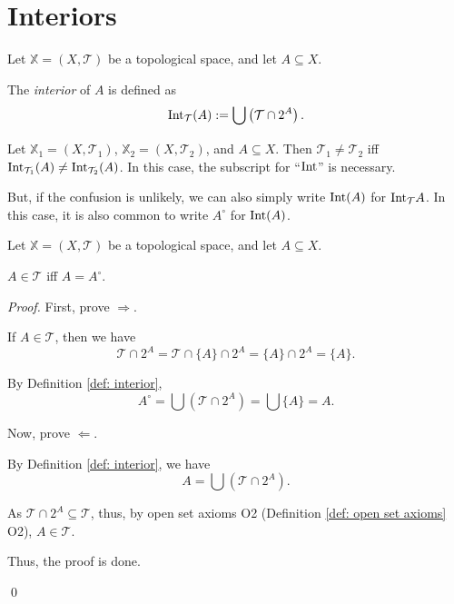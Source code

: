 \section{Interiors}


\begin{definition}
	\label{def: interior}
	Let $\mathbb X = (X, \mathcal T)$ be a topological space, and let $A \subseteq X$.
	
	The \textit{interior} of $A$ is defined as
	$$
	\mathrm{Int}_{\mathcal T}(A) := \bigcup \left(\mathcal T \cap 2^A \right).
	$$
\end{definition}


\begin{note}
	Let $\mathbb X_1 = (X, \mathcal T_1)$, $\mathbb X_2 = (X, \mathcal T_2)$, and $A \subseteq X$. Then $\mathcal T_1 \ne \mathcal T_2$ iff $\mathrm{Int}_{\mathcal T_1}(A) \ne \mathrm{Int}_{\mathcal T_2}(A)$. In this case, the subscript for ``$\mathrm{Int}$'' is necessary.
	
	But, if the confusion is unlikely, we can also simply write $\mathrm{Int} (A)$ for $\mathrm{Int}_\mathcal T A$. In this case, it is also common to write $A^\circ$ for $\mathrm{Int}(A)$.
\end{note}


\begin{theorem}
	\label{thm: open set is its own interior}
	Let $\mathbb X = (X, \mathcal T)$ be a topological space, and let $A \subseteq X$.
	
	$A \in \mathcal T$ iff $A = A^\circ$.
	
	\begin{proof}
		First, prove $\Rightarrow$.
		
		If $A \in \mathcal T$, then we have
		$$
		\mathcal T \cap 2^A = \mathcal T \cap \{A\} \cap 2^A = \{A\} \cap 2^A = \{A\}.
		$$
		
		By Definition \ref{def: interior},
		$$
		A^\circ = \bigcup(\mathcal T \cap 2^A) = \bigcup\{A\} = A.
		$$
		
		\qedlm
		
		Now, prove $\Leftarrow$.
		
		By Definition \ref{def: interior}, we have
		$$
		A = \bigcup(\mathcal T \cap 2^A).
		$$
		
		As $\mathcal T \cap 2^A \subseteq \mathcal T$, thus, by open set axioms O2 (Definition \ref{def: open set axioms} O2), $A \in \mathcal T$.
		
		\qedlm
		
		Thus, the proof is done.
		
		\qed
	\end{proof}
\end{theorem}


